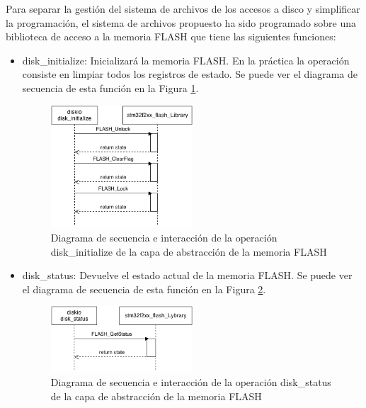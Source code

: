 Para separar la gestión del sistema de archivos de los accesos a disco y simplificar la programación, el sistema de archivos propuesto ha sido programado sobre una biblioteca de acceso a la memoria FLASH que tiene las siguientes funciones:

\begin{itemize}
\item disk\_initialize: Inicializará la memoria FLASH. En la práctica la operación consiste en limpiar todos los registros de estado. Se puede ver el diagrama de secuencia de esta función en la Figura \ref{fig:diskinitialize}.\\

\begin{figure}[!h]
\begin{center}
\includegraphics[width=0.5\textwidth]{figs/diskinitialize.png}
\caption{Diagrama de secuencia e interacción de la operación disk\_initialize de la capa de abstracción de la memoria FLASH}
\label{fig:diskinitialize}
\end{center}
\end{figure}

\item disk\_status: Devuelve el estado actual de la memoria FLASH. Se puede ver el diagrama de secuencia de esta función en la Figura \ref{fig:diskstatus}.\\

\begin{figure}[!h]
\begin{center}
\includegraphics[width=0.5\textwidth]{figs/diskstatus.png}
\caption{Diagrama de secuencia e interacción de la operación disk\_status de la capa de abstracción de la memoria FLASH}
\label{fig:diskstatus}
\end{center}
\end{figure}


\end{itemize}
